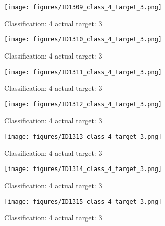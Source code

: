 \begin{figure}[h!]
\begin{center}
\texttt{[image: figures/ID1309\_class\_4\_target\_3.png]}
\end{center}
\caption{ Classification: 4 actual target: 3}
\label{fig:ID1309_class_4_target_3}
\end{figure}
\begin{figure}[h!]
\begin{center}
\texttt{[image: figures/ID1310\_class\_4\_target\_3.png]}
\end{center}
\caption{ Classification: 4 actual target: 3}
\label{fig:ID1310_class_4_target_3}
\end{figure}
\begin{figure}[h!]
\begin{center}
\texttt{[image: figures/ID1311\_class\_4\_target\_3.png]}
\end{center}
\caption{ Classification: 4 actual target: 3}
\label{fig:ID1311_class_4_target_3}
\end{figure}
\begin{figure}[h!]
\begin{center}
\texttt{[image: figures/ID1312\_class\_4\_target\_3.png]}
\end{center}
\caption{ Classification: 4 actual target: 3}
\label{fig:ID1312_class_4_target_3}
\end{figure}
\begin{figure}[h!]
\begin{center}
\texttt{[image: figures/ID1313\_class\_4\_target\_3.png]}
\end{center}
\caption{ Classification: 4 actual target: 3}
\label{fig:ID1313_class_4_target_3}
\end{figure}
\begin{figure}[h!]
\begin{center}
\texttt{[image: figures/ID1314\_class\_4\_target\_3.png]}
\end{center}
\caption{ Classification: 4 actual target: 3}
\label{fig:ID1314_class_4_target_3}
\end{figure}
\begin{figure}[h!]
\begin{center}
\texttt{[image: figures/ID1315\_class\_4\_target\_3.png]}
\end{center}
\caption{ Classification: 4 actual target: 3}
\label{fig:ID1315_class_4_target_3}
\end{figure}

